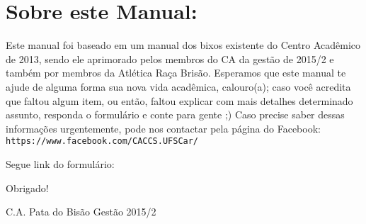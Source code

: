 \section{Sobre este Manual:}
Este manual foi baseado em um manual dos bixos existente do Centro Acadêmico de 2013, sendo ele aprimorado pelos membros do CA da gestão de 2015/2 e também por membros da Atlética Raça Brisão.
Esperamos que este manual te ajude de alguma forma sua nova vida acadêmica, calouro(a); caso você acredita que faltou algum item, ou então, faltou explicar com mais detalhes determinado assunto, responda o formulário e conte para gente ;)
Caso precise saber dessas informações urgentemente, pode nos contactar pela página do Facebook: \texttt{https://www.facebook.com/CACCS.UFSCar/}

\begin{flushleft}
  Segue link do formulário: 
\end{flushleft}
\begin{flushright}
  Obrigado!

  C.A. Pata do Bisão Gestão 2015/2
\end{flushright}

